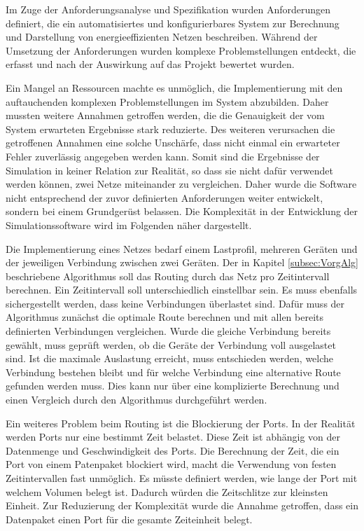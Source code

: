 Im Zuge der Anforderungsanalyse und Spezifikation wurden Anforderungen definiert, die ein automatisiertes und konfigurierbares System zur Berechnung und Darstellung von energieeffizienten Netzen beschreiben. Während der Umsetzung der Anforderungen wurden komplexe Problemstellungen entdeckt, die erfasst und nach der Auswirkung auf das Projekt bewertet wurden. 

Ein Mangel an Ressourcen machte es unmöglich, die Implementierung mit den auftauchenden komplexen Problemstellungen im System abzubilden. Daher mussten weitere Annahmen getroffen werden, die die Genauigkeit der vom System erwarteten Ergebnisse stark reduzierte. Des weiteren verursachen die getroffenen Annahmen eine solche Unschärfe, dass nicht einmal ein erwarteter Fehler zuverlässig angegeben werden kann. Somit sind die Ergebnisse der Simulation in keiner Relation zur Realität, so dass sie nicht dafür verwendet werden können, zwei Netze miteinander zu vergleichen. Daher wurde die Software nicht entsprechend der zuvor definierten Anforderungen weiter entwickelt, sondern bei einem Grundgerüst belassen. Die Komplexität in der  Entwicklung der Simulationssoftware wird im Folgenden näher dargestellt.  

Die Implementierung eines Netzes bedarf einem Lastprofil, mehreren Geräten und der jeweiligen Verbindung zwischen zwei Geräten. Der in Kapitel \ref{subsec:VorgAlg} beschriebene Algorithmus soll das Routing durch das Netz pro Zeitintervall berechnen. Ein Zeitintervall soll unterschiedlich einstellbar sein. Es muss ebenfalls sichergestellt werden, dass keine Verbindungen überlastet sind. Dafür muss der Algorithmus zunächst die optimale Route berechnen und mit allen bereits definierten Verbindungen vergleichen. Wurde die gleiche Verbindung bereits gewählt, muss geprüft werden, ob die Geräte der Verbindung voll ausgelastet sind. Ist die maximale Auslastung erreicht, muss entschieden werden, welche Verbindung bestehen bleibt und für welche Verbindung eine alternative Route gefunden werden muss. Dies kann nur über eine komplizierte Berechnung und einen Vergleich durch den Algorithmus durchgeführt werden. 

Ein weiteres Problem beim Routing ist die Blockierung der Ports. In der Realität werden Ports nur eine bestimmt Zeit belastet. Diese Zeit ist abhängig von der Datenmenge und Geschwindigkeit des Ports. Die Berechnung der Zeit, die ein Port von einem Patenpaket blockiert wird, macht  die Verwendung von festen Zeitintervallen fast unmöglich. Es müsste  definiert werden, wie lange der Port mit welchem Volumen belegt ist. Dadurch würden die Zeitschlitze zur kleinsten Einheit. Zur Reduzierung der Komplexität wurde die Annahme getroffen, dass ein Datenpaket einen Port für die gesamte Zeiteinheit belegt. 

